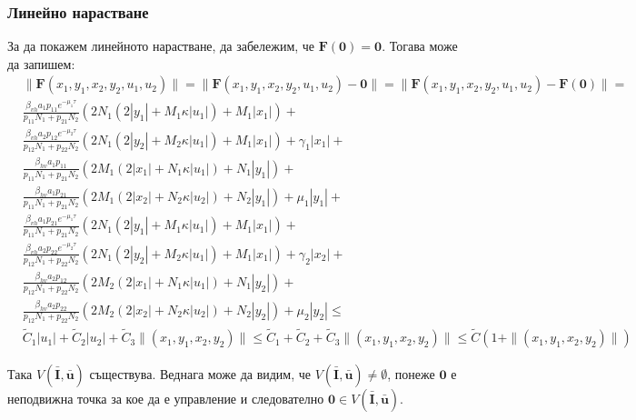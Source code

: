 \subsubsection{Линейно нарастване}
За да покажем линейното нарастване, да забележим, че $\mathbf{F}(\mathbf{0}) = \mathbf{0}$. Тогава може да запишем:
\begin{align*}
  &\|\mathbf{F}(x_1, y_1, x_2, y_2, u_1, u_2)\| = \|\mathbf{F}(x_1, y_1, x_2, y_2, u_1, u_2) - \mathbf{0}\| = \|\mathbf{F}(x_1, y_1, x_2, y_2, u_1, u_2) - \mathbf{F}(\mathbf{0})\| = \\
  &\frac{\beta_{vh} a_1 p_{11} e^{-\mu_1 \tau}}{p_{11} N_1 + p_{21} N_2} (2 N_1 (2 |y_1| + M_1 \kappa |u_1|) + M_1 |x_1|) + \\
  &\frac{\beta_{vh} a_2 p_{12} e^{-\mu_2 \tau}}{p_{12} N_1 + p_{22} N_2}(2 N_1 (2 |y_2| + M_2 \kappa |u_1|) + M_1 |x_1|) + \gamma_1 |x_1| + \\
  &\frac{\beta_{hv} a_1 p_{11}}{p_{11} N_1 + p_{21} N_2} (2 M_1 (2|x_1| + N_1 \kappa |u_1|) + N_1 |y_1|) + \\
  &\frac{\beta_{hv} a_1 p_{21}}{p_{11} N_1 + p_{21} N_2} (2 M_1 (2|x_2| + N_2 \kappa |u_2|) + N_2 |y_1|) + \mu_1 |y_1| + \\
  &\frac{\beta_{vh} a_1 p_{21} e^{-\mu_1 \tau}}{p_{11} N_1 + p_{21} N_2} (2 N_1 (2|y_1| + M_1 \kappa |u_1|) + M_1 |x_1|) + \\
  &\frac{\beta_{vh} a_2 p_{22} e^{-\mu_2 \tau}}{p_{12} N_1 + p_{22} N_2}(2 N_1 (2|y_2| + M_2 \kappa |u_1|) + M_1 |x_1|) + \gamma_2 |x_2| + \\
  &\frac{\beta_{hv} a_2 p_{12}}{p_{12} N_1 + p_{22} N_2} (2 M_2 (2|x_1| + N_1 \kappa |u_1|) + N_1 |y_2|) + \\
  &\frac{\beta_{hv} a_2 p_{22}}{p_{12} N_1 + p_{22} N_2} (2 M_2 (2|x_2| + N_2 \kappa |u_2|) + N_2 |y_2|) + \mu_2 |y_2| \leq \\
  &\tilde{C}_1|u_1| + \tilde{C}_2|u_2| + \tilde{C}_3 \|(x_1,y_1,x_2,y_2)\| \leq \tilde{C}_1 + \tilde{C}_2 + \tilde{C}_3 \|(x_1,y_1,x_2,y_2)\| \leq \tilde{C}(1 + \|(x_1,y_1,x_2,y_2)\|)
\end{align*}

Така $V(\bar{\mathbf{I}}, \bar{\mathbf{u}})$ съществува. Веднага може да видим, че $V(\bar{\mathbf{I}}, \bar{\mathbf{u}}) \neq \emptyset$, понеже $\mathbf{0}$ е неподвижна точка за кое да е управление и следователно $\mathbf{0} \in V(\bar{\mathbf{I}}, \bar{\mathbf{u}})$.
